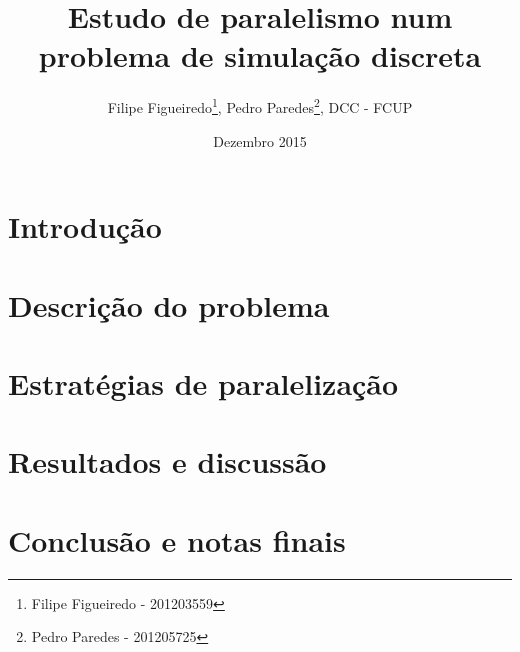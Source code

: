 \documentclass[10pt,a4paper,oneside]{article}
\title{Estudo de paralelismo num problema de simulação discreta}
\author{Filipe Figueiredo\footnote{Filipe Figueiredo - 201203559},
  Pedro Paredes\footnote{Pedro Paredes - 201205725}, DCC - FCUP}
\date{Dezembro 2015}
\begin{document}
\maketitle


\section{Introdução}
\label{sec:intro}



\section{Descrição do problema}
\label{sec:prob}



\section{Estratégias de paralelização}
\label{sec:par}



\section{Resultados e discussão}
\label{sec:res}



\section{Conclusão e notas finais}
\label{sec:con}

%
%
\end{document}
